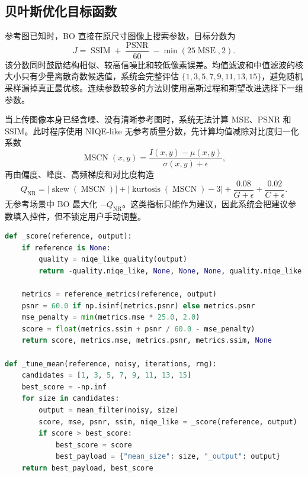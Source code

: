 \documentclass[UTF8,a4paper,12pt]{ctexart}
\begin{document}
\subsection{贝叶斯优化目标函数}

参考图已知时，BO 直接在原尺寸图像上搜索参数，目标分数为
\begin{equation}
J=\operatorname{SSIM}+\frac{\operatorname{PSNR}}{60}
-\min(25\operatorname{MSE},2).
\end{equation}
该分数同时鼓励结构相似、较高信噪比和较低像素误差。均值滤波和中值滤波的核大小只有少量离散奇数候选值，系统会完整评估 $\{1,3,5,7,9,11,13,15\}$，避免随机采样漏掉真正最优核。连续参数较多的方法则使用高斯过程和期望改进选择下一组参数。

当上传图像本身已经含噪、没有清晰参考图时，系统无法计算 MSE、PSNR 和 SSIM。此时程序使用 NIQE-like 无参考质量分数，先计算均值减除对比度归一化系数
\begin{equation}
\operatorname{MSCN}(x,y)=\frac{I(x,y)-\mu(x,y)}{\sigma(x,y)+\epsilon},
\end{equation}
再由偏度、峰度、高频梯度和对比度构造
\begin{equation}
Q_{\text{NR}}=
|\operatorname{skew}(\operatorname{MSCN})|
+|\operatorname{kurtosis}(\operatorname{MSCN})-3|
+\frac{0.08}{G+\epsilon}
+\frac{0.02}{C+\epsilon}.
\end{equation}
无参考场景中 BO 最大化 $-Q_{\text{NR}}$。这类指标只能作为建议，因此系统会把建议参数填入控件，但不锁定用户手动调整。

\begin{lstlisting}[language=Python,caption={自动调参目标分数与离散核搜索}]
def _score(reference, output):
    if reference is None:
        quality = niqe_like_quality(output)
        return -quality.niqe_like, None, None, None, quality.niqe_like

    metrics = reference_metrics(reference, output)
    psnr = 60.0 if np.isinf(metrics.psnr) else metrics.psnr
    mse_penalty = min(metrics.mse * 25.0, 2.0)
    score = float(metrics.ssim + psnr / 60.0 - mse_penalty)
    return score, metrics.mse, metrics.psnr, metrics.ssim, None

def _tune_mean(reference, noisy, iterations, rng):
    candidates = [1, 3, 5, 7, 9, 11, 13, 15]
    best_score = -np.inf
    for size in candidates:
        output = mean_filter(noisy, size)
        score, mse, psnr, ssim, niqe_like = _score(reference, output)
        if score > best_score:
            best_score = score
            best_payload = {"mean_size": size, "_output": output}
    return best_payload, best_score
\end{lstlisting}
\end{document}
